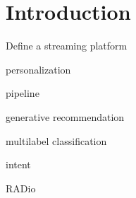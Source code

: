 
\chapter{Introduction}
\label{chapter:introduction}

Define a streaming platform


personalization

pipeline

generative recommendation

multilabel classification

intent

RADio







